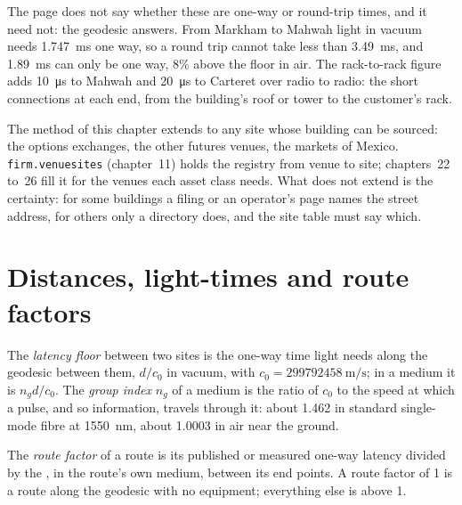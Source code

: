 The page does not say whether these are one-way or round-trip times, and it need not: the geodesic answers. From Markham to Mahwah light in
vacuum needs \qty{1.747}{\milli\second} one way, so a round trip cannot take less than \qty{3.49}{\milli\second}, and \qty{1.89}{\milli\second}
can only be one way, 8\% above the floor in air. The rack-to-rack figure adds \qty{10}{\micro\second} to Mahwah and \qty{20}{\micro\second} to
Carteret over radio to radio: the short connections at each end, from the building's roof or tower to the customer's rack.

\begin{remark}\label{rem:nw:the-north-american-map:rest}
The method of this chapter extends to any site whose building can be sourced: the options exchanges, the other futures venues, the markets
of Mexico. \texttt{firm.venuesites} (chapter~11) holds the registry from venue to site; chapters~22 to~26 fill it for the venues
each asset class needs. What does not extend is the certainty: for some buildings a filing or an operator's page names the street address, for
others only a directory does, and the site table must say which.
\end{remark}

\section{Distances, light-times and route factors}

\begin{definition}\label{def:nw:the-north-american-map:floor}
The \emph{latency floor} between two sites is the one-way time light needs along the geodesic between them, $d/c_0$ in
vacuum, with $c_0 = \qty{299792458}{\metre\per\second}$; in a medium it is $n_g d / c_0$. The \emph{group index} $n_g$ of a
medium is the ratio of $c_0$ to the speed at which a pulse, and so information, travels through it: about 1.462 in standard single-mode fibre
at \qty{1550}{\nano\metre}, about 1.0003 in air near the ground.
\end{definition}

\begin{definition}\label{def:nw:the-north-american-map:factor}
The \emph{route factor} of a route is its published or measured one-way latency divided by the , in the route's
own medium, between its end points. A route factor of 1 is a route along the geodesic with no equipment; everything else is above 1.
\end{definition}

